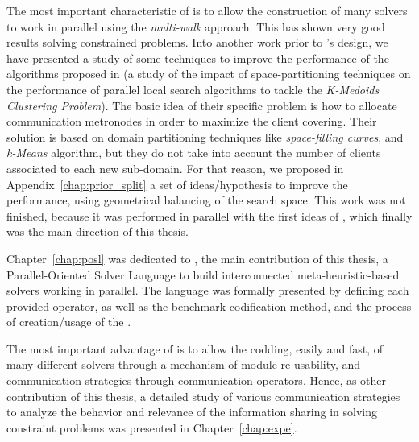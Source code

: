 The most important characteristic of \posl{} is to allow the construction of many solvers to work in parallel using the \textit{multi-walk} approach. This has shown very good results solving constrained problems. Into another work prior to \posl's design, we have presented a study of some techniques to improve the performance of the algorithms proposed in \cite{Arbelaez2012} (\ie a study of the impact of space-partitioning techniques on the performance of parallel local search algorithms to tackle the \textit{K-Medoids Clustering Problem}). The basic idea of their specific problem is how to allocate communication metronodes in order to maximize the client covering. Their solution is based on domain partitioning techniques like {\it space-filling curves}, and {\it k-Means} algorithm, but they do not take into account the number of clients associated to each new sub-domain. For that reason, we proposed in Appendix~\ref{chap:prior_split} a set of ideas/hypothesis to improve the performance, using geometrical balancing of the search space. This work was not finished, because it was performed in parallel with the first ideas of \posl, which finally was the main direction of this thesis.

Chapter~\ref{chap:posl} was dedicated to \posl, the main contribution of this thesis, a Parallel-Oriented Solver Language to build
interconnected meta-heuristic-based solvers working in parallel. The language was formally presented by defining each provided operator, as well as the benchmark codification method, and the process of creation/usage of the \bothmodules. 

The most important advantage of \posl{} is to allow the codding, easily and fast, of many different solvers through a mechanism of module re-usability, and communication strategies through communication operators. Hence, as other contribution of this thesis, a detailed study of various communication strategies to analyze the behavior and relevance of the information sharing in solving constraint problems was presented in Chapter~\ref{chap:expe}.

